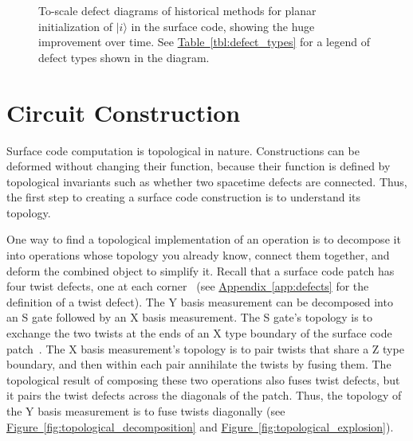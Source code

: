 \documentclass[onecolumn,unpublished,a4paper]{quantumarticle}
\theoremstyle{definition}
\theoremstyle{definition}
\theoremstyle{definition}
\DeclareRobustCommand{\app}[1]{\hyperref[app:#1]{Appendix~\ref*{app:#1}}}
\newcommand{\fig}[1]{\hyperref[fig:#1]{Figure~\ref*{fig:#1}}}
\newcommand{\tbl}[1]{\hyperref[tbl:#1]{Table~\ref*{tbl:#1}}}
\begin{document}
\begin{figure}
    \centering
    \caption{
    To-scale defect diagrams of historical methods for planar initialization of $|i\rangle$ in the surface code, showing the huge improvement over time.
    See \tbl{defect_types} for a legend of defect types shown in the diagram.
    }
    \label{fig:historical_progression}
\end{figure}





\section{Circuit Construction}
\label{sec:construction}

Surface code computation is topological in nature.
Constructions can be deformed without changing their function, because their function is defined by topological invariants such as whether two spacetime defects are connected.
Thus, the first step to creating a surface code construction is to understand its topology.

One way to find a topological implementation of an operation is to decompose it into operations whose topology you already know, connect them together, and deform the combined object to simplify it.
Recall that a surface code patch has four twist defects, one at each corner~\cite{brown2017surfacetwists} (see \app{defects} for the definition of a twist defect).
The Y basis measurement can be decomposed into an S gate followed by an X basis measurement.
The S gate's topology is to exchange the two twists at the ends of an X type boundary of the surface code patch~\cite{brown2017surfacetwists}.
The X basis measurement's topology is to pair twists that share a Z type boundary, and then within each pair annihilate the twists by fusing them.
The topological result of composing these two operations also fuses twist defects, but it pairs the twist defects across the diagonals of the patch.
Thus, the topology of the Y basis measurement is to fuse twists diagonally (see \fig{topological_decomposition} and \fig{topological_explosion}).
\end{document}
